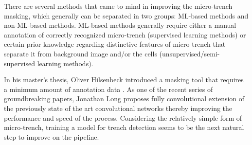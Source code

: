 \documentclass[pdftex,12pt,a4paper]{report}
\begin{document}
There are several methods that came to mind in improving the micro-trench masking, which generally can be separated in two groups: ML-based methods and non-ML-based methods. ML-based methods generally require either a manual annotation of correctly recognized micro-trench (supervised learning methods) or certain prior knowledge regarding distinctive features of micro-trench that separate it from background image and/or the cells (unsupervised/semi-supervised learning methods).

In his master's thesis, Oliver Hilsenbeck introduced a masking tool that requires a minimum amount of annotation data \cite{hilsenbeck2014maximally}. As one of the recent series of groundbreaking papers, Jonathan Long proposes fully convolutional extension \cite{long2015fully} of the previously state of the art convolutional networks \cite{simonyan2014very, szegedy2015going} thereby improving the performance and speed of the process. Considering the relatively simple form of micro-trench, training a model for trench detection seems to be the next natural step to improve on the pipeline.






\end{document}
